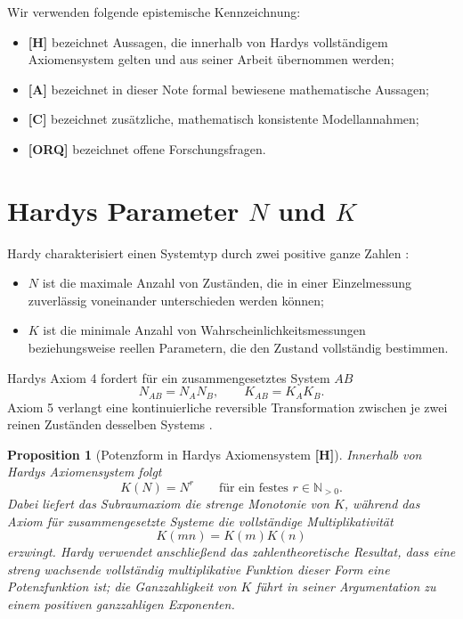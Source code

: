 \documentclass[11pt,a4paper,reqno]{amsart}
\newtheorem{proposition}[theorem]{Proposition}
\theoremstyle{definition}
\theoremstyle{remark}
\newcommand{\N}{\mathbb{N}}
\newcommand{\StatusH}{\textnormal{\textbf{[H]}}}
\newcommand{\StatusA}{\textnormal{\textbf{[A]}}}
\newcommand{\StatusC}{\textnormal{\textbf{[C]}}}
\newcommand{\StatusORQ}{\textnormal{\textbf{[ORQ]}}}
\begin{document}
Wir verwenden folgende epistemische Kennzeichnung:
\begin{itemize}[leftmargin=2.2em]
  \item \StatusH{} bezeichnet Aussagen, die innerhalb von Hardys vollständigem Axiomensystem gelten und aus seiner Arbeit übernommen werden;
  \item \StatusA{} bezeichnet in dieser Note formal bewiesene mathematische Aussagen;
  \item \StatusC{} bezeichnet zusätzliche, mathematisch konsistente Modellannahmen;
  \item \StatusORQ{} bezeichnet offene Forschungsfragen.
\end{itemize}

\section{Hardys Parameter \texorpdfstring{$N$ und $K$}{N und K}}

Hardy charakterisiert einen Systemtyp durch zwei positive ganze Zahlen \cite{Hardy2001}:
\begin{itemize}[leftmargin=2.2em]
  \item $N$ ist die maximale Anzahl von Zuständen, die in einer Einzelmessung zuverlässig voneinander unterschieden werden können;
  \item $K$ ist die minimale Anzahl von Wahrscheinlichkeitsmessungen beziehungsweise reellen Parametern, die den Zustand vollständig bestimmen.
\end{itemize}

Hardys Axiom 4 fordert für ein zusammengesetztes System $AB$
\begin{equation}
N_{AB}=N_A N_B,
\qquad
K_{AB}=K_A K_B.
\end{equation}
Axiom 5 verlangt eine kontinuierliche reversible Transformation zwischen je zwei reinen Zuständen desselben Systems \cite{Hardy2001}.

\begin{proposition}[Potenzform in Hardys Axiomensystem \StatusH]
\label{prop:hardy-power}
Innerhalb von Hardys Axiomensystem folgt
\begin{equation}
K(N)=N^r
\qquad\text{für ein festes }r\in\N_{>0}.
\end{equation}
Dabei liefert das Subraumaxiom die strenge Monotonie von $K$, während das Axiom für zusammengesetzte Systeme die vollständige Multiplikativität
\begin{equation}
K(mn)=K(m)K(n)
\end{equation}
erzwingt. Hardy verwendet anschließend das zahlentheoretische Resultat, dass eine streng wachsende vollständig multiplikative Funktion dieser Form eine Potenzfunktion ist; die Ganzzahligkeit von $K$ führt in seiner Argumentation zu einem positiven ganzzahligen Exponenten.
\end{proposition}
\end{document}
